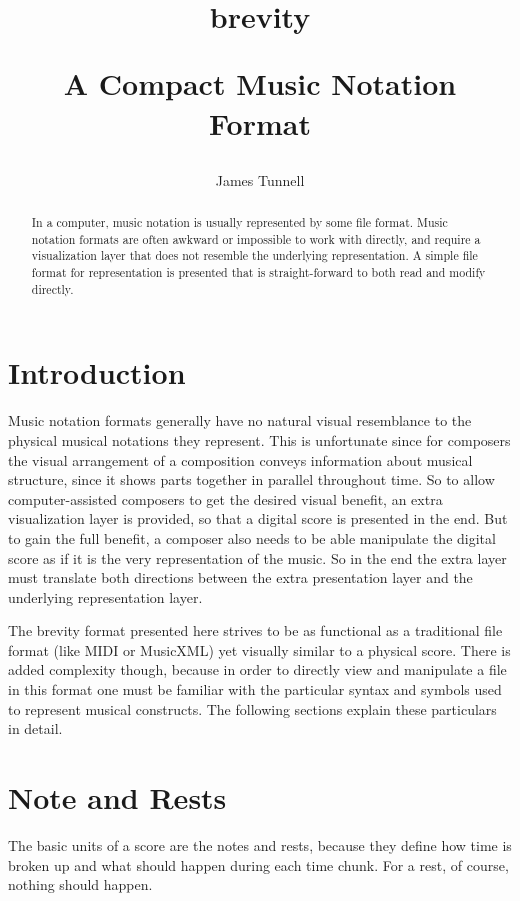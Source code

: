\documentclass{scrartcl}
\begin{document}
\author{James Tunnell}
\title{brevity\\
\begin{LARGE}
A Compact Music Notation Format
\end{LARGE}}
\maketitle

\begin{abstract}
In a computer, music notation is usually represented by some file format. Music notation formats are often awkward or impossible to work with directly, and require a visualization layer that does not resemble the underlying representation. A simple file format for representation is presented that is straight-forward to both read and modify directly.
\end{abstract}

\tableofcontents

\section{Introduction}
Music notation formats generally have no natural visual resemblance to the physical musical notations they represent. This is unfortunate since for composers the visual arrangement of a composition conveys information about musical structure, since it shows parts together in parallel throughout time. So to allow computer-assisted composers to get the desired visual benefit, an extra visualization layer is provided, so that a digital score is presented in the end. But to gain the full benefit, a composer also needs to be able manipulate the digital score as if it is the very representation of the music. So in the end the extra layer must translate both directions between the extra presentation layer and the underlying representation layer.

The brevity format presented here strives to be as functional as a traditional file format (like MIDI or MusicXML) yet visually similar to a physical score. There is added complexity though, because in order to directly view and manipulate a file in this format one must be familiar with the particular syntax and symbols used to represent musical constructs. The following sections explain these particulars in detail.

\section{Note and Rests}
The basic units of a score are the notes and rests, because they define how time is broken up and what should happen during each time chunk. For a rest, of course, nothing should happen. 
\end{document}
